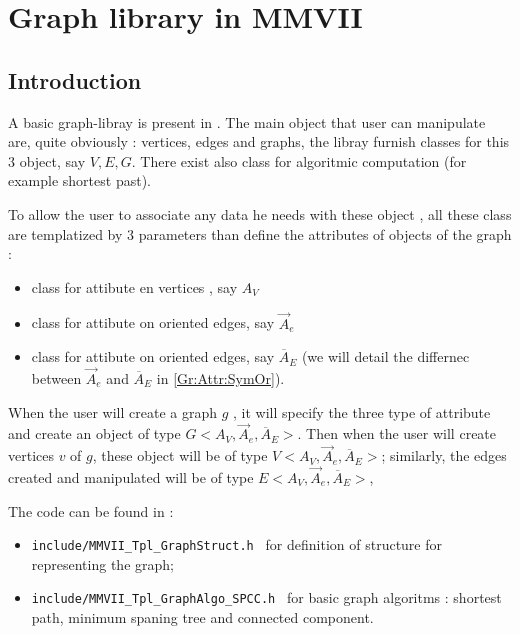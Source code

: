 


\chapter{Graph library in MMVII}



\section{Introduction}

A basic graph-libray is present in \PPP.  The main object that user can
manipulate are, quite obviously : vertices, edges and graphs, the libray
furnish classes for this $3$ object, say $V,E,G$.
There exist also class for algoritmic computation (for example shortest past).

To allow the user to associate any data he needs with these object , all these class
are templatized by $3$ parameters than define the attributes of objects of the graph :

\begin{itemize}
      \item  class for attibute en vertices , say $A_V$
      \item  class for attibute on oriented edges, say $\vec{A}_e$
      \item  class for attibute on oriented edges, say $\overline{A}_E$ (we will detail the differnec 
             between  $\vec{A}_e$ and  $\overline{A}_E$ in \ref{Gr:Attr:SymOr}).
\end{itemize}

When the user will create a graph $g$ , it will specify the three type of attribute and create
an object of type $G<A_V,\vec{A}_e,\overline{A}_E>$.  Then when the user will create
vertices $v$ of $g$, these object will be of type $V<A_V,\vec{A}_e,\overline{A}_E>$;
similarly, the edges created and manipulated  will be of type $E<A_V,\vec{A}_e,\overline{A}_E>$,

The code can be found in :

\begin{itemize}
    \item {\tt include/MMVII\_Tpl\_GraphStruct.h } for definition of structure for representing the graph;
    \item {\tt include/MMVII\_Tpl\_GraphAlgo\_SPCC.h } for basic graph algoritms : shortest path, minimum
          spaning tree and connected component.
\end{itemize}

